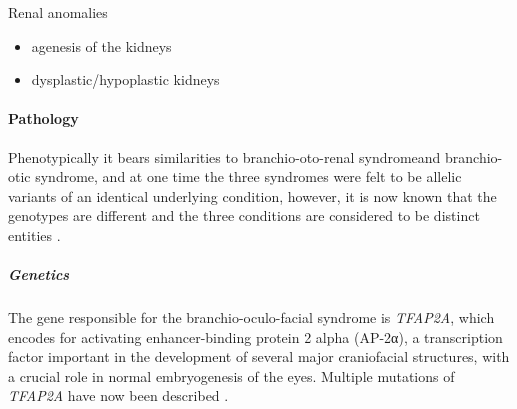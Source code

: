 Renal anomalies

\begin{itemize}
	\tightlist
	\item
	agenesis of the kidneys
	\item
	dysplastic/hypoplastic kidneys
\end{itemize}

\paragraph{Pathology}

Phenotypically it bears similarities to branchio-oto-renal syndromeand branchio-otic syndrome, and at one time the three syndromes were felt to be allelic variants of an identical underlying condition, however, it is now known that the genotypes are different and the three conditions are considered to be distinct entities .

\subparagraph{Genetics}

The gene responsible for the branchio-oculo-facial syndrome is \emph{TFAP2A}, which encodes for activating enhancer-binding protein 2 alpha (AP-2α), a transcription factor important in the development of several major craniofacial structures, with a crucial role in normal embryogenesis of the eyes. Multiple mutations of \emph{TFAP2A} have now been described .